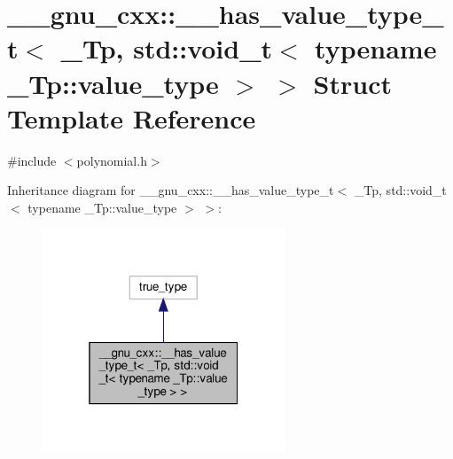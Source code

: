 \hypertarget{struct____gnu__cxx_1_1____has__value__type__t_3_01__Tp_00_01std_1_1void__t_3_01typename_01__Tp_1_1value__type_01_4_01_4}{}\section{\+\_\+\+\_\+gnu\+\_\+cxx\+:\+:\+\_\+\+\_\+has\+\_\+value\+\_\+type\+\_\+t$<$ \+\_\+\+Tp, std\+:\+:void\+\_\+t$<$ typename \+\_\+\+Tp\+:\+:value\+\_\+type $>$ $>$ Struct Template Reference}
\label{struct____gnu__cxx_1_1____has__value__type__t_3_01__Tp_00_01std_1_1void__t_3_01typename_01__Tp_1_1value__type_01_4_01_4}


{\ttfamily \#include $<$polynomial.\+h$>$}



Inheritance diagram for \+\_\+\+\_\+gnu\+\_\+cxx\+:\+:\+\_\+\+\_\+has\+\_\+value\+\_\+type\+\_\+t$<$ \+\_\+\+Tp, std\+:\+:void\+\_\+t$<$ typename \+\_\+\+Tp\+:\+:value\+\_\+type $>$ $>$\+:
\nopagebreak
\begin{figure}[H]
\begin{center}
\leavevmode
\includegraphics[width=205pt]{struct____gnu__cxx_1_1____has__value__type__t_3_01__Tp_00_01std_1_1void__t_3_01typename_01__Tp_1dc53b51a0e8d38321c66760e53731ac5}
\end{center}
\end{figure}


